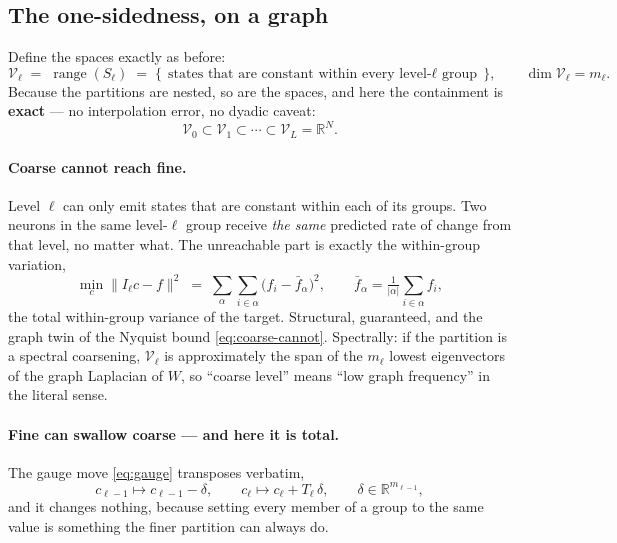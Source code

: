 \documentclass[11pt,a4paper]{article}
\newcommand{\Vs}{\mathcal{V}}
\newcommand{\ran}{\operatorname{range}}
\begin{document}
\subsection{The one-sidedness, on a graph}

Define the spaces exactly as before:
\begin{equation}
\Vs_\ell \;=\; \ran(S_\ell)
\;=\; \{\, \text{states that are constant within every level-$\ell$ group} \,\},
\qquad \dim \Vs_\ell = m_\ell .
\label{eq:gVspace}
\end{equation}
Because the partitions are nested, so are the spaces, and here the containment is
\textbf{exact} --- no interpolation error, no dyadic caveat:
\begin{equation}
\Vs_0 \subset \Vs_1 \subset \cdots \subset \Vs_L = \mathbb{R}^N .
\label{eq:gnested}
\end{equation}

\paragraph{Coarse cannot reach fine.} Level $\ell$ can only emit states that are constant
within each of its groups. Two neurons in the same level-$\ell$ group receive \emph{the
same} predicted rate of change from that level, no matter what. The unreachable part is
exactly the within-group variation,
\begin{equation}
\min_c \big\| I_\ell c - f \big\|^2
\;=\; \sum_{\alpha}\sum_{i \in \alpha}
\big( f_i - \bar f_\alpha \big)^2 ,
\qquad \bar f_\alpha = \tfrac{1}{|\alpha|}\textstyle\sum_{i\in\alpha} f_i ,
\label{eq:gcoarse-cannot}
\end{equation}
the total within-group variance of the target. Structural, guaranteed, and the graph twin
of the Nyquist bound \eqref{eq:coarse-cannot}. Spectrally: if the partition is a spectral
coarsening, $\Vs_\ell$ is approximately the span of the $m_\ell$ lowest eigenvectors of the
graph Laplacian of $W$, so ``coarse level'' means ``low graph frequency'' in the literal
sense.

\paragraph{Fine can swallow coarse --- and here it is total.} The gauge move
\eqref{eq:gauge} transposes verbatim,
\begin{equation}
c_{\ell-1} \longmapsto c_{\ell-1} - \delta ,
\qquad
c_{\ell} \longmapsto c_{\ell} + T_\ell\,\delta ,
\qquad \delta \in \mathbb{R}^{m_{\ell-1}} ,
\label{eq:ggauge}
\end{equation}
and it changes nothing, because setting every member of a group to the same value is
something the finer partition can always do.
\end{document}
